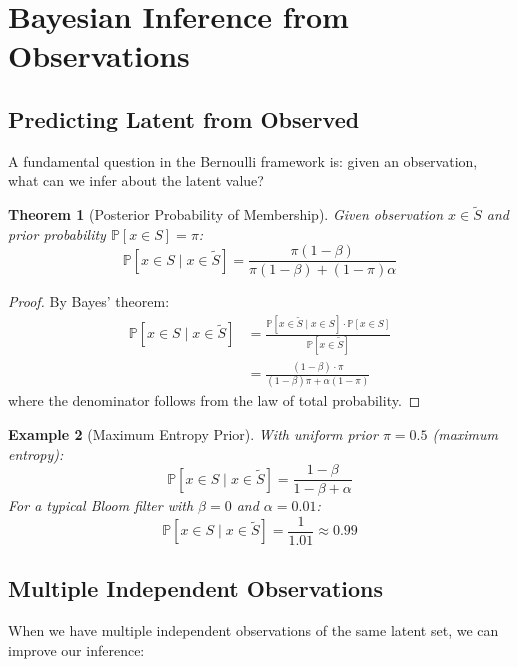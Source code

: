 \documentclass[11pt,final,hidelinks]{article}
\newtheorem{theorem}{Theorem}[section]
\newtheorem{example}[theorem]{Example}
\newcommand{\obs}[1]{\widetilde{#1}}  %
\newcommand{\Prob}[1]{\mathbb{P}\left[#1\right]}
\newcommand{\ProbCond}[2]{\mathbb{P}\left[#1 \mid #2\right]}
\newcommand{\fprate}{\alpha}
\newcommand{\fnrate}{\beta}
\begin{document}
\section{Bayesian Inference from Observations}

\subsection{Predicting Latent from Observed}

A fundamental question in the Bernoulli framework is: given an observation, what can we infer about the latent value?

\begin{theorem}[Posterior Probability of Membership]
Given observation $x \in \obs{S}$ and prior probability $\Prob{x \in S} = \pi$:
\begin{equation}
\ProbCond{x \in S}{x \in \obs{S}} = \frac{\pi(1-\fnrate)}{\pi(1-\fnrate) + (1-\pi)\fprate}
\end{equation}
\end{theorem}

\begin{proof}
By Bayes' theorem:
\begin{align}
\ProbCond{x \in S}{x \in \obs{S}} &= \frac{\ProbCond{x \in \obs{S}}{x \in S} \cdot \Prob{x \in S}}{\Prob{x \in \obs{S}}} \\
&= \frac{(1-\fnrate) \cdot \pi}{(1-\fnrate)\pi + \fprate(1-\pi)}
\end{align}
where the denominator follows from the law of total probability.
\end{proof}

\begin{example}[Maximum Entropy Prior]
With uniform prior $\pi = 0.5$ (maximum entropy):
\begin{equation}
\ProbCond{x \in S}{x \in \obs{S}} = \frac{1-\fnrate}{1-\fnrate + \fprate}
\end{equation}
For a typical Bloom filter with $\fnrate = 0$ and $\fprate = 0.01$:
\begin{equation}
\ProbCond{x \in S}{x \in \obs{S}} = \frac{1}{1.01} \approx 0.99
\end{equation}
\end{example}

\subsection{Multiple Independent Observations}

When we have multiple independent observations of the same latent set, we can improve our inference:
\end{document}
